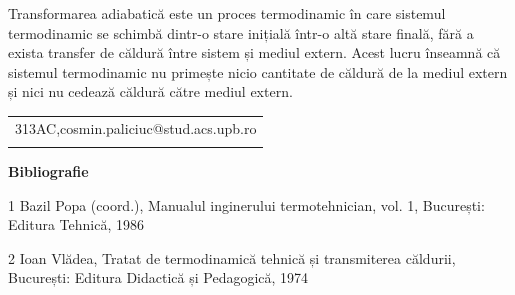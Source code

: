 \documentclass[11pt]{article}
\begin{document}
	Transformarea adiabatică este un proces termodinamic în care sistemul termodinamic se schimbă dintr-o stare inițială într-o altă stare finală, fără a exista transfer de căldură între sistem și mediul extern. Acest lucru înseamnă că sistemul termodinamic nu primește nicio cantitate de căldură de la mediul extern și nici nu cedează căldură către mediul extern.
	
	\begin{table}[H]
	\begin{adjustbox}{max width=\textwidth}
	\begin{tabular}{p{6.49cm}}
	\hline
	\multicolumn{1}{p{6.49cm}}{{\footnotesize 313AC,cosmin.paliciuc@stud.acs.upb.ro}} \\ 
	\hhline{~}
	\end{tabular}
	\end{adjustbox}
	\end{table}
	\textbf{Bibliografie}
	
	1 Bazil Popa (coord.), Manualul inginerului termotehnician, vol. 1, București: Editura Tehnică, 1986
	
	2 Ioan Vlădea, Tratat de termodinamică tehnică și transmiterea căldurii, București: Editura Didactică și Pedagogică, 1974
	
\end{document}
